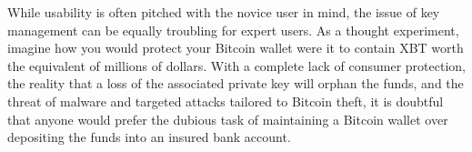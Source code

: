 While usability is often pitched with the novice user in mind, the issue of key management can be equally troubling for expert users. As a thought experiment, imagine how you would protect your Bitcoin wallet were it to contain XBT worth the equivalent of millions of dollars. With a complete lack of consumer protection, the reality that a loss of the associated private key will orphan the funds, and the threat of malware and targeted attacks tailored to Bitcoin theft, it is doubtful that anyone would prefer the dubious task of maintaining a Bitcoin wallet over depositing the funds into an insured bank account. 



